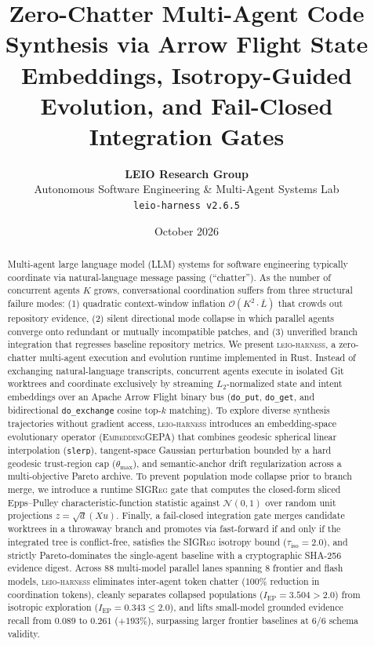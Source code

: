 \documentclass[11pt]{article}
\title{\textbf{Zero-Chatter Multi-Agent Code Synthesis via Arrow Flight State Embeddings, Isotropy-Guided Evolution, and Fail-Closed Integration Gates}}
\author{
  \textbf{LEIO Research Group} \\
  Autonomous Software Engineering \& Multi-Agent Systems Lab \\
  \texttt{leio-harness v2.6.5}
}
\date{October 2026}
\begin{document}
\maketitle

\begin{abstract}
Multi-agent large language model (LLM) systems for software engineering typically coordinate via natural-language message passing (``chatter''). As the number of concurrent agents $K$ grows, conversational coordination suffers from three structural failure modes: (1) quadratic context-window inflation $\mathcal{O}(K^2 \cdot \bar{L})$ that crowds out repository evidence, (2) silent directional mode collapse in which parallel agents converge onto redundant or mutually incompatible patches, and (3) unverified branch integration that regresses baseline repository metrics. We present \textsc{leio-harness}, a zero-chatter multi-agent execution and evolution runtime implemented in Rust. Instead of exchanging natural-language transcripts, concurrent agents execute in isolated Git worktrees and coordinate exclusively by streaming $L_2$-normalized state and intent embeddings over an Apache Arrow Flight binary bus (\texttt{do\_put}, \texttt{do\_get}, and bidirectional \texttt{do\_exchange} cosine top-$k$ matching). To explore diverse synthesis trajectories without gradient access, \textsc{leio-harness} introduces an embedding-space evolutionary operator (\textsc{EmbeddingGEPA}) that combines geodesic spherical linear interpolation (\texttt{slerp}), tangent-space Gaussian perturbation bounded by a hard geodesic trust-region cap ($\theta_{\max}$), and semantic-anchor drift regularization across a multi-objective Pareto archive. To prevent population mode collapse prior to branch merge, we introduce a runtime \textsc{SIGReg} gate that computes the closed-form sliced Epps--Pulley characteristic-function statistic against $\mathcal{N}(0,1)$ over random unit projections $z = \sqrt{d}(Xu)$. Finally, a fail-closed integration gate merges candidate worktrees in a throwaway branch and promotes via fast-forward if and only if the integrated tree is conflict-free, satisfies the \textsc{SIGReg} isotropy bound ($\tau_{\text{iso}} = 2.0$), and strictly Pareto-dominates the single-agent baseline with a cryptographic SHA-256 evidence digest. Across 88 multi-model parallel lanes spanning 8 frontier and flash models, \textsc{leio-harness} eliminates inter-agent token chatter ($100\%$ reduction in coordination tokens), cleanly separates collapsed populations ($I_{\text{EP}} = 3.504 > 2.0$) from isotropic exploration ($I_{\text{EP}} = 0.343 \le 2.0$), and lifts small-model grounded evidence recall from $0.089$ to $0.261$ ($+193\%$), surpassing larger frontier baselines at $6/6$ schema validity.
\end{abstract}
\end{document}
